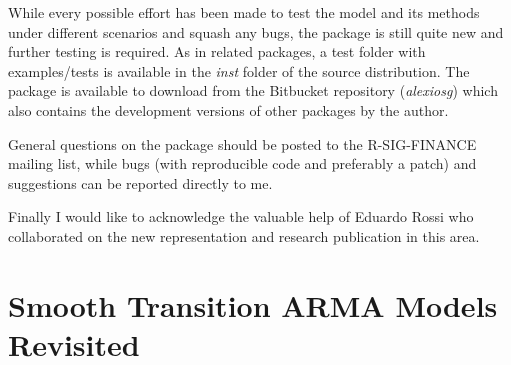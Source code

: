 While every possible effort has been made to test the model and its methods
under different scenarios and squash any bugs, the package is still quite new
and further testing is required. As in related packages, a test folder with
examples/tests is available in the \emph{inst} folder of the source
distribution. The package is available to download from the Bitbucket
repository (\emph{alexiosg}) which also contains the development versions
of other packages by the author.

General questions on the package should be posted to the R-SIG-FINANCE mailing
list, while bugs (with reproducible code and preferably a patch) and 
suggestions can be reported directly to me.

Finally I would like to acknowledge the valuable help of Eduardo Rossi who
collaborated on the new representation and research publication in this area.

\section{Smooth Transition ARMA Models Revisited}\label{sec:1}
